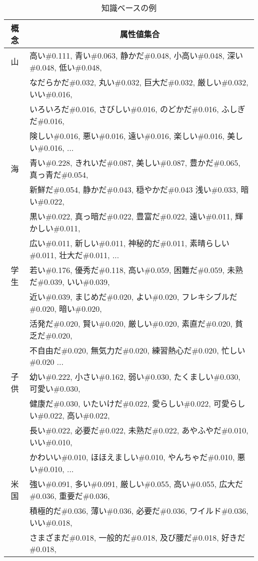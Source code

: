 \begin{table}[tb]
\begin{center}
\caption{知識ベースの例}
\label{tbl:nov-ex0}
\begin{tabular}{|c|l|}
\hline
概念	&\multicolumn{1}{|c|}{属性値集合}\\
\hline
山&
高い\#0.111,
青い\#0.063,
静かだ\#0.048,
小高い\#0.048,
深い\#0.048,
低い\#0.048,
\\&
なだらかだ\#0.032,
丸い\#0.032,
巨大だ\#0.032,
厳しい\#0.032,
いい\#0.016,
\\&
いろいろだ\#0.016,
さびしい\#0.016,
のどかだ\#0.016,
ふしぎだ\#0.016,
\\&
険しい\#0.016,
悪い\#0.016,
遠い\#0.016,
楽しい\#0.016,
美しい\#0.016,
...\\
\hline
海&
青い\#0.228,
きれいだ\#0.087,
美しい\#0.087,
豊かだ\#0.065,
真っ青だ\#0.054,
\\&
新鮮だ\#0.054,
静かだ\#0.043,
穏やかだ\#0.043
浅い\#0.033,
暗い\#0.022,
\\&
黒い\#0.022,
真っ暗だ\#0.022,
豊富だ\#0.022,
遠い\#0.011,
輝かしい\#0.011,
\\&
広い\#0.011,
新しい\#0.011,
神秘的だ\#0.011,
素晴らしい\#0.011,
壮大だ\#0.011,
...\\
\hline
学生&
若い\#0.176,
優秀だ\#0.118,
高い\#0.059,
困難だ\#0.059,
未熟だ\#0.039,
いい\#0.039,
\\&
近い\#0.039,
まじめだ\#0.020,
よい\#0.020,
フレキシブルだ\#0.020,
暗い\#0.020,
\\&
活発だ\#0.020,
賢い\#0.020,
厳しい\#0.020,
素直だ\#0.020,
貧乏だ\#0.020,
\\&
不自由だ\#0.020,
無気力だ\#0.020,
練習熱心だ\#0.020,
忙しい\#0.020
...\\
\hline
子供&
幼い\#0.222,
小さい\#0.162,
弱い\#0.030,
たくましい\#0.030,
可愛い\#0.030,
\\&
健康だ\#0.030,
いたいけだ\#0.022,
愛らしい\#0.022,
可愛らしい\#0.022,
高い\#0.022,
\\&
長い\#0.022,
必要だ\#0.022,
未熟だ\#0.022,
あやふやだ\#0.010,
いい\#0.010,
\\&
かわいい\#0.010,
ほほえましい\#0.010,
やんちゃだ\#0.010,
悪い\#0.010,
...\\
\hline
米国&
強い\#0.091,
多い\#0.091,
厳しい\#0.055,
高い\#0.055,
広大だ\#0.036,
重要だ\#0.036,
\\&
積極的だ\#0.036,
薄い\#0.036,
必要だ\#0.036,
ワイルド\#0.036,
いい\#0.018,
\\&
さまざまだ\#0.018,
一般的だ\#0.018,
及び腰だ\#0.018,
好きだ\#0.018,

\end{tabular}
\end{center}
\end{table}
